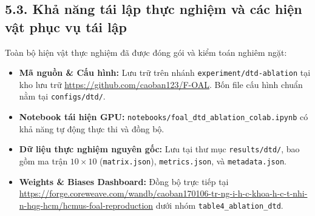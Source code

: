 \documentclass{article}
\begin{document}
\subsection{5.3. Khả năng tái lập thực nghiệm và các hiện vật phục vụ tái lập}
Toàn bộ hiện vật thực nghiệm đã được đóng gói và kiểm toán nghiêm ngặt:
\begin{itemize}
    \item \textbf{Mã nguồn \& Cấu hình:} Lưu trữ trên nhánh \texttt{experiment/dtd-ablation} tại kho lưu trữ \url{https://github.com/caoban123/F-OAL}. Bốn file cấu hình chuẩn nằm tại \texttt{configs/dtd/}.
    \item \textbf{Notebook tái hiện GPU:} \texttt{notebooks/foal\_dtd\_ablation\_colab.ipynb} có khả năng tự động thực thi và đồng bộ.
    \item \textbf{Dữ liệu thực nghiệm nguyên gốc:} Lưu tại thư mục \texttt{results/dtd/}, bao gồm ma trận $10 \times 10$ (\texttt{matrix.json}), \texttt{metrics.json}, và \texttt{metadata.json}.
    \item \textbf{Weights \& Biases Dashboard:} Đồng bộ trực tiếp tại \url{https://forge.coreweave.com/wandb/caoban170106-tr-ng-i-h-c-khoa-h-c-t-nhi-n-hqg-hcm/hcmus-foal-reproduction} dưới nhóm \texttt{table4\_ablation\_dtd}.
\end{itemize}

\nocite{*}


\end{document}

